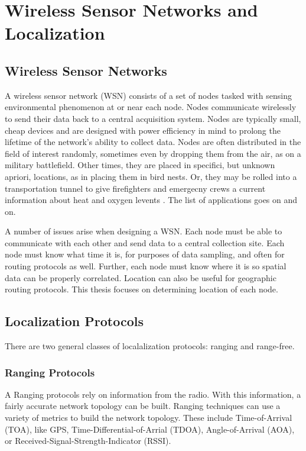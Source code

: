 \chapter{Wireless Sensor Networks and Localization}
\section{Wireless Sensor Networks}

A wireless sensor network (WSN) consists of a set of nodes tasked with sensing environmental phenomenon at or near each node.  Nodes communicate wirelessly to send their data back to a central acquisition system.  Nodes are typically small, cheap devices and are designed with power efficiency in mind to prolong the lifetime of the network's ability to collect data.  Nodes are often distributed in the field of interest randomly, sometimes even by dropping them from the air, as on a military battlefield.  Other times, they are placed in specifici, but unknown apriori, locations, as in placing them in bird nests\cite{birds}.  Or, they may be rolled into a transportation tunnel to give firefighters and emergecny crews a current information about heat and oxygen levents \cite{runes}.  The list of applications goes on and on.

A number of issues arise when designing a WSN.  Each node must be able to communicate with each other and send data to a central collection site.  Each node must know what time it is, for purposes of data sampling, and often for routing protocols as well.  Further, each node must know where it is so spatial data can be properly correlated.  Location can also be useful for geographic routing protocols.  This thesis focuses on determining location of each node.

\section{Localization Protocols}

There are two general classes of localalization protocols: ranging and range-free.  

\subsection{Ranging Protocols}A
Ranging protocols rely on information from the radio. With this information, a fairly accurate network topology can be built.  Ranging techniques can use a variety of metrics to build the network topology.  These include Time-of-Arrival (TOA), like GPS\cite{Wellenhoff},  Time-Differential-of-Arrial (TDOA)\cite{Savvides}, Angle-of-Arrival (AOA)\cite{Niculescu}, or Received-Signal-Strength-Indicator (RSSI)\cite{Patwari}.  

